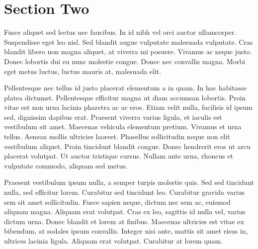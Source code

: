 \section{Section Two}
Fusce aliquet sed lectus nec faucibus. In id nibh vel orci auctor
ullamcorper. Suspendisse eget leo nisl. Sed blandit augue vulputate
malesuada vulputate. Cras blandit libero non magna aliquet, at viverra
mi posuere. Vivamus ac neque justo. Donec lobortis dui eu nunc molestie
congue. Donec nec convallis magna. Morbi eget metus luctus, luctus
mauris at, malesuada elit.

Pellentesque nec tellus id justo placerat elementum a in quam. In hac
habitasse platea dictumst. Pellentesque efficitur magna ut diam accumsan
lobortis. Proin vitae est non urna lacinia pharetra ac ac eros. Etiam
velit nulla, facilisis id ipsum sed, dignissim dapibus erat. Praesent
viverra varius ligula, et iaculis est vestibulum sit amet. Maecenas
vehicula elementum pretium. Vivamus et urna tellus. Aenean mollis
ultricies laoreet. Phasellus sollicitudin neque non elit vestibulum
aliquet. Proin tincidunt blandit congue. Donec hendrerit eros ut arcu
placerat volutpat. Ut auctor tristique cursus. Nullam ante urna, rhoncus
et vulputate commodo, aliquam sed metus.

Praesent vestibulum ipsum nulla, a semper turpis molestie quis. Sed sed
tincidunt nulla, sed efficitur lorem. Curabitur sed tincidunt
leo. Curabitur gravida varius sem sit amet sollicitudin. Fusce sapien
neque, dictum nec sem ac, euismod aliquam magna. Aliquam erat
volutpat. Cras ex leo, sagittis id nulla vel, varius dictum urna. Donec
blandit et lorem at finibus. Maecenas ultricies est vitae ex bibendum,
at sodales ipsum convallis. Integer nisi ante, mattis sit amet risus in,
ultrices lacinia ligula. Aliquam erat volutpat. Curabitur at lorem
quam.

